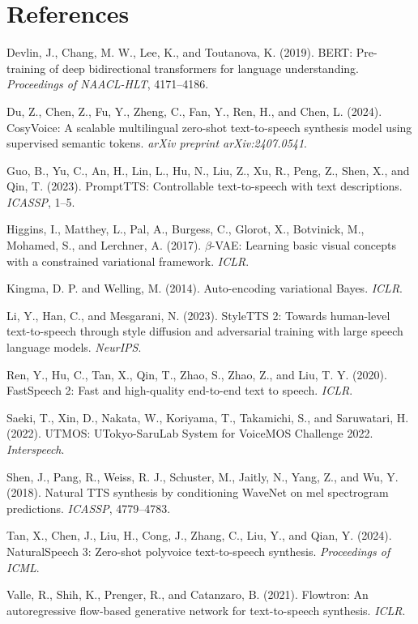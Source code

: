 \documentclass{article}
\begin{document}
\section{References}

\label{sec:references}

Devlin, J., Chang, M. W., Lee, K., and Toutanova, K. (2019). BERT: Pre-training of deep bidirectional transformers for language understanding. \textit{Proceedings of NAACL-HLT}, 4171--4186.

Du, Z., Chen, Z., Fu, Y., Zheng, C., Fan, Y., Ren, H., and Chen, L. (2024). CosyVoice: A scalable multilingual zero-shot text-to-speech synthesis model using supervised semantic tokens. \textit{arXiv preprint arXiv:2407.0541}.

Guo, B., Yu, C., An, H., Lin, L., Hu, N., Liu, Z., Xu, R., Peng, Z., Shen, X., and Qin, T. (2023). PromptTTS: Controllable text-to-speech with text descriptions. \textit{ICASSP}, 1--5.

Higgins, I., Matthey, L., Pal, A., Burgess, C., Glorot, X., Botvinick, M., Mohamed, S., and Lerchner, A. (2017). $\beta$-VAE: Learning basic visual concepts with a constrained variational framework. \textit{ICLR}.

Kingma, D. P. and Welling, M. (2014). Auto-encoding variational Bayes. \textit{ICLR}.

Li, Y., Han, C., and Mesgarani, N. (2023). StyleTTS 2: Towards human-level text-to-speech through style diffusion and adversarial training with large speech language models. \textit{NeurIPS}.

Ren, Y., Hu, C., Tan, X., Qin, T., Zhao, S., Zhao, Z., and Liu, T. Y. (2020). FastSpeech 2: Fast and high-quality end-to-end text to speech. \textit{ICLR}.

Saeki, T., Xin, D., Nakata, W., Koriyama, T., Takamichi, S., and Saruwatari, H. (2022). UTMOS: UTokyo-SaruLab System for VoiceMOS Challenge 2022. \textit{Interspeech}.

Shen, J., Pang, R., Weiss, R. J., Schuster, M., Jaitly, N., Yang, Z., and Wu, Y. (2018). Natural TTS synthesis by conditioning WaveNet on mel spectrogram predictions. \textit{ICASSP}, 4779--4783.

Tan, X., Chen, J., Liu, H., Cong, J., Zhang, C., Liu, Y., and Qian, Y. (2024). NaturalSpeech 3: Zero-shot polyvoice text-to-speech synthesis. \textit{Proceedings of ICML}.

Valle, R., Shih, K., Prenger, R., and Catanzaro, B. (2021). Flowtron: An autoregressive flow-based generative network for text-to-speech synthesis. \textit{ICLR}.
\end{document}
